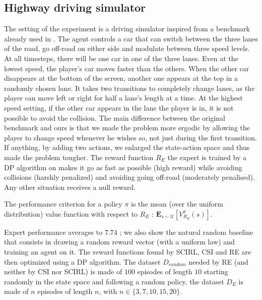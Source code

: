 \documentclass{llncs}
\begin{document}
\subsection{Highway driving simulator}
\label{subsec:highway}
The setting of the experiment is a driving simulator inspired from a benchmark already used in \cite{syed2008apprenticeship,syed2008game}. The agent controls a car that can switch between the three lanes of the road, go off-road on either side and modulate between three speed levels. At all timesteps, there will be one car in one of the three lanes. Even at the lowest speed, the player's car moves faster than the others. When the other car disappears at the bottom of the screen, another one appears at the top in a randomly chosen lane. It takes two transitions to completely change lanes, as the player can move left or right for half a lane's length at a time. At the highest speed setting, if the other car appears in the lane the player is in, it is not possible to avoid the collision. The main difference between the original benchmark \cite{syed2008apprenticeship,syed2008game} and ours is that we made the problem more ergodic by allowing the player to change speed whenever he wishes so, not just during the first transition. If anything, by adding two actions, we enlarged the state-action space and thus made the problem tougher.
The reward function $R_E$ the expert is trained by a DP algorithm on makes it go as fast as possible (high reward) while avoiding collisions (harshly penalized) and avoiding going off-road (moderately penalised). Any other situation receives a null reward.


The performance criterion for a policy $\pi$ is the mean (over the uniform distribution) value function with respect to $R_E$ : $\mathbf{E}_{s\sim\mathcal{U}}[V^{\pi}_{R_E}(s)]$. 

Expert performance averages to $7.74$ ; we also show the natural random baseline that consists in drawing a random reward vector (with a uniform law) and training an agent on it. The reward functions found by SCIRL, CSI and RE are then optimized using a DP algorithm. The dataset $D_{random}$ needed by RE (and neither by CSI nor SCIRL) is made of $100$ episodes of length $10$ starting randomly in the state space and following a random policy. the dataset $D_E$ is made of $n$ episodes of length $n$, with $n \in \{3,7,10,15,20\}$.
\end{document}
